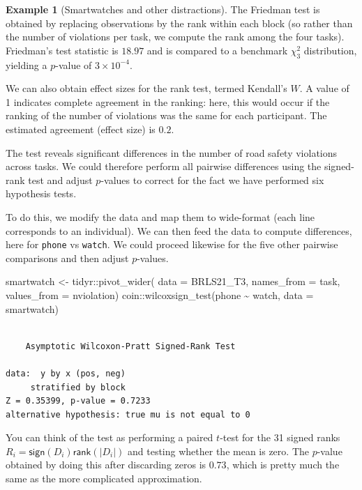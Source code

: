 \documentclass[
  11pt,
  letterpaper,
]{scrbook}
\newenvironment{Shaded}{\begin{snugshade}}{\end{snugshade}}
\newcommand{\AttributeTok}[1]{\textcolor[rgb]{0.40,0.45,0.13}{#1}}
\newcommand{\FunctionTok}[1]{\textcolor[rgb]{0.28,0.35,0.67}{#1}}
\newcommand{\NormalTok}[1]{\textcolor[rgb]{0.00,0.23,0.31}{#1}}
\newcommand{\OtherTok}[1]{\textcolor[rgb]{0.00,0.23,0.31}{#1}}
\newcommand{\SpecialCharTok}[1]{\textcolor[rgb]{0.37,0.37,0.37}{#1}}
\theoremstyle{definition}
\theoremstyle{definition}
\newtheorem{example}{Example}[chapter]
\theoremstyle{remark}
\begin{document}
\begin{example}[Smartwatches and other
distractions]
The Friedman test is obtained by replacing observations by the rank
within each block (so rather than the number of violations per task, we
compute the rank among the four tasks). Friedman's test statistic is
\(18.97\) and is compared to a benchmark \(\chi^2_3\) distribution,
yielding a \(p\)-value of \(\ensuremath{3\times 10^{-4}}.\)

We can also obtain effect sizes for the rank test, termed Kendall's
\(W.\) A value of 1 indicates complete agreement in the ranking: here,
this would occur if the ranking of the number of violations was the same
for each participant. The estimated agreement (effect size) is \(0.2.\)

The test reveals significant differences in the number of road safety
violations across tasks. We could therefore perform all pairwise
differences using the signed-rank test and adjust \(p\)-values to
correct for the fact we have performed six hypothesis tests.

To do this, we modify the data and map them to wide-format (each line
corresponds to an individual). We can then feed the data to compute
differences, here for \texttt{phone} vs \texttt{watch}. We could proceed
likewise for the five other pairwise comparisons and then adjust
\(p\)-values.

\begin{Shaded}
\begin{Highlighting}[]
\NormalTok{smartwatch }\OtherTok{\textless{}{-}}\NormalTok{ tidyr}\SpecialCharTok{::}\FunctionTok{pivot\_wider}\NormalTok{(}
  \AttributeTok{data =}\NormalTok{ BRLS21\_T3,}
  \AttributeTok{names\_from =}\NormalTok{ task,}
  \AttributeTok{values\_from =}\NormalTok{ nviolation)}
\NormalTok{coin}\SpecialCharTok{::}\FunctionTok{wilcoxsign\_test}\NormalTok{(phone }\SpecialCharTok{\textasciitilde{}}\NormalTok{ watch,}
                      \AttributeTok{data =}\NormalTok{ smartwatch)}
\end{Highlighting}
\end{Shaded}

\begin{verbatim}

    Asymptotic Wilcoxon-Pratt Signed-Rank Test

data:  y by x (pos, neg) 
     stratified by block
Z = 0.35399, p-value = 0.7233
alternative hypothesis: true mu is not equal to 0
\end{verbatim}

You can think of the test as performing a paired \(t\)-test for the 31
signed ranks \(R_i =\mathsf{sign}(D_i) \mathsf{rank}(|D_i|)\) and
testing whether the mean is zero. The \(p\)-value obtained by doing this
after discarding zeros is \(0.73\), which is pretty much the same as the
more complicated approximation.

\end{example}
\end{document}
